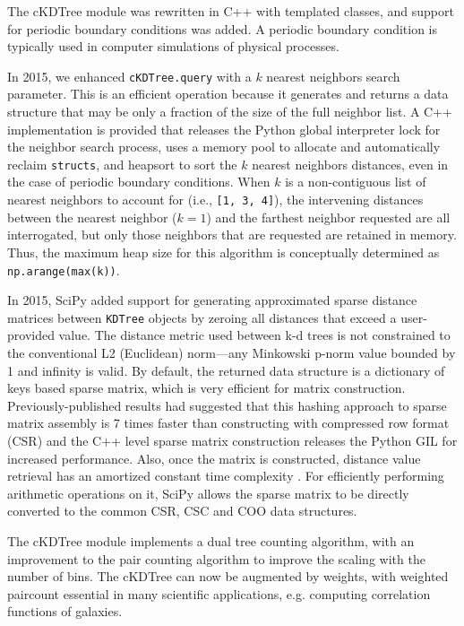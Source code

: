 The cKDTree module was rewritten in C++ with templated classes, and support for
periodic boundary conditions was added. A periodic boundary condition is typically 
used in computer simulations of physical processes.

In 2015, we enhanced \texttt{cKDTree.query} with a $k$ nearest neighbors search
parameter. This is an efficient operation\cite{Sproull:1991:RNS:3118219.3118331} 
because it generates and returns a data structure that may be only a fraction 
of the size of the full neighbor list. A C++ implementation is provided that releases
the Python global interpreter lock for the neighbor search process, uses
a memory pool to allocate and automatically reclaim \texttt{structs}, and
heapsort to sort the $k$ nearest neighbors distances, even in the case
of periodic boundary conditions. When $k$ is a non-contiguous list of nearest
neighbors to account for (i.e., \texttt{[1, 3, 4]}), the intervening distances
between the nearest neighbor ($k = 1$) and the farthest neighbor requested
are all interrogated, but only those neighbors that are requested are retained
in memory. Thus, the maximum heap size for this algorithm is conceptually determined
as \texttt{np.arange(max(k))}.

In 2015, SciPy added support for generating approximated sparse distance matrices 
between \texttt{KDTree} objects by zeroing all distances that exceed a user-provided value. 
The distance metric used between k-d trees is not constrained to the 
conventional L2 (Euclidean) norm---any Minkowski p-norm value bounded by 1 and 
infinity is valid. By default, the returned data structure is a dictionary of 
keys based sparse matrix, which is very efficient for matrix construction. 
Previously-published results had suggested that this hashing approach to sparse 
matrix assembly is 7 times faster than constructing with compressed row format (CSR)
\cite{10.1007/978-3-540-75755-9_107} and the C++ level sparse matrix construction 
releases the Python GIL for increased performance. Also, once the matrix is 
constructed, distance value retrieval has an amortized constant time complexity 
\cite{Cormen:2001:IA:580470}. For efficiently performing arithmetic operations 
on it, SciPy allows the sparse matrix to be directly converted to the common 
CSR, CSC and COO data structures.

The cKDTree module implements a dual tree counting algorithm\cite{Moore2000ar},
with an improvement to the pair counting algorithm to improve the scaling
with the number of bins. The cKDTree can now be augmented by weights, with 
weighted paircount essential in many scientific applications, e.g. computing 
correlation functions of galaxies\cite{0004-637X-750-1-38}.

